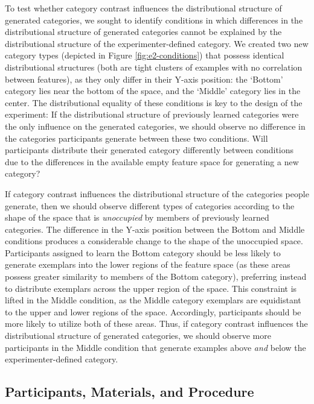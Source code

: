 \documentclass[pdflatex,sn-apa]{sn-jnl}%
\theoremstyle{thmstyleone}%
\theoremstyle{thmstyletwo}%
\theoremstyle{thmstylethree}%
\begin{document}
To test whether category contrast influences the distributional structure of
generated categories, we sought to identify conditions in which differences in
the distributional structure of generated categories cannot be explained by the
distributional structure of the experimenter-defined category. We created two
new category types (depicted in Figure \ref{fig:e2-conditions}) that possess
identical distributional structures (both are tight clusters of examples with no
correlation between features), as they only differ in their Y-axis position: the
`Bottom' category lies near the bottom of the space, and the `Middle' category
lies in the center. The distributional equality of these conditions is key to
the design of the experiment: If the distributional structure of previously
learned categories were the only influence on the generated categories, we
should observe no difference in the categories participants generate between
these two conditions. Will participants distribute their generated category
differently between conditions due to the differences in the available empty
feature space for generating a new category?

If category contrast influences the distributional structure of the categories
people generate, then we should observe different types of categories according
to the shape of the space that is {\em unoccupied} by members of previously
learned categories. The difference in the Y-axis position between the Bottom and
Middle conditions produces a considerable change to the shape of the unoccupied
space. Participants assigned to learn the Bottom category should be less likely
to generate exemplars into the lower regions of the feature space (as these
areas possess greater similarity to members of the Bottom category), preferring
instead to distribute exemplars across the upper region of the space. This
constraint is lifted in the Middle condition, as the Middle category exemplars
are equidistant to the upper and lower regions of the space. Accordingly,
participants should be more likely to utilize both of these areas. Thus, if
category contrast influences the distributional structure of generated
categories, we should observe more participants in the Middle condition that
generate examples above {\em and} below the experimenter-defined category.


\subsection{Participants, Materials, and Procedure}
\end{document}
